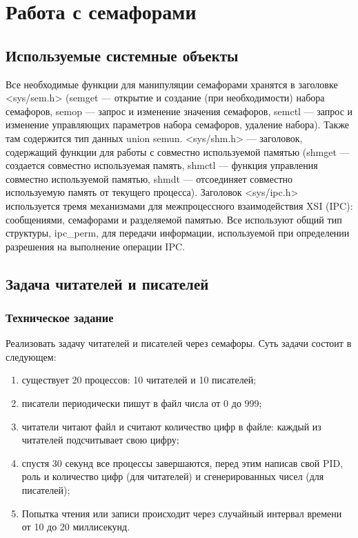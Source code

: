 \documentclass[a4paper,12pt]{extarticle}
\begin{document}
\newpage

\section{Работа с семафорами}
\subsection{Используемые системные объекты}
 Все необходимые функции для манипуляции семафорами хранятся в заголовке <sys/sem.h> (semget --- открытие и создание (при необходимости) набора семафоров, semop --- запрос и изменение значения семафоров, semctl --- запрос и изменение управляющих параметров набора семафоров, удаление набора). Также там содержится тип данных union semun.\newline
 <sys/shm.h> --- заголовок, содержащий функции для работы с совместно используемой памятью (shmget --- создается совместно используемая память, shmctl --- функция управления совместно используемой памятью, shmdt --- отсоединяет совместно используемую память от текущего процесса).\newline
 Заголовок <sys/ipc.h> используется тремя механизмами для межпроцессного взаимодействия XSI (IPC): сообщениями, семафорами и разделяемой памятью. Все используют общий тип структуры, ipc\_perm, для передачи информации, используемой при определении разрешения на выполнение операции IPC.\newline

\subsection{Задача читателей и писателей}
\subsubsection{Техническое задание}
Реализовать задачу читателей и писателей через семафоры. Суть задачи состоит в следующем:
\begin{enumerate} 
  \item существует 20 процессов: 10 читателей и 10 писателей; 
  \item писатели периодически пишут в файл числа от 0 до 999;
  \item читатели читают файл и считают количество цифр в файле: каждый из читателей подсчитывает свою цифру;
  \item спустя 30 секунд все процессы завершаются, перед этим написав свой PID, роль и количество цифр (для читателей) и сгенерированных чисел (для писателей);
  \item Попытка чтения или записи происходит через случайный интервал времени от 10 до 20 миллисекунд.
\end{enumerate}
\end{document}
